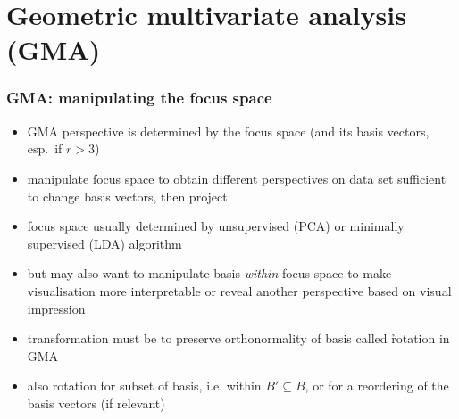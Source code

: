 \documentclass[t]{beamer} %
\begin{document}


\section{Geometric multivariate analysis (GMA)}


\begin{frame}
  \frametitle{GMA: manipulating the focus space}

  \begin{itemize}
  \item GMA perspective is determined by the focus space (and its basis vectors, esp.\ if $r > 3$)
  \item manipulate focus space to obtain different perspectives on data set \so sufficient to change basis vectors, then project
  \item focus space usually determined by unsupervised (PCA) or minimally supervised (LDA) algorithm
  \item but may also want to manipulate basis \emph{within} focus space to make visualisation more interpretable or reveal another perspective \so based on visual impression
  \item transformation must be  to preserve orthonormality of basis \so called \h{rotation} in GMA
  \item also rotation for subset of basis, i.e. within $B'\subseteq B$, or for a reordering of the basis vectors (if relevant)
  \end{itemize}
\end{frame}
\end{document}
